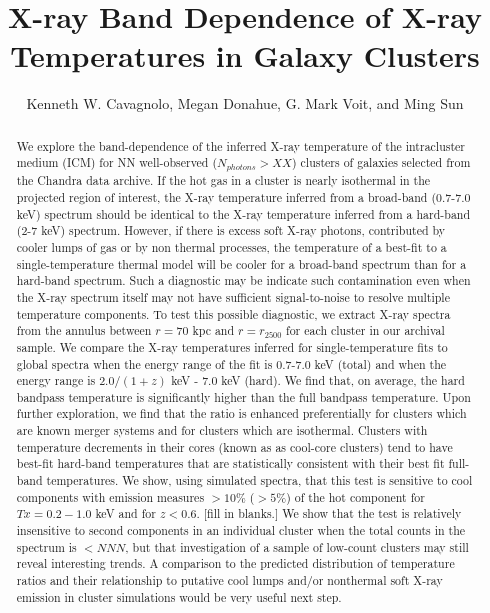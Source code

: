 \documentclass{emulateapj}
\begin{document}
\title{X-ray Band Dependence of X-ray \\
	Temperatures in Galaxy Clusters}
\author{Kenneth W. Cavagnolo, Megan
Donahue, G. Mark Voit, and Ming
Sun}


\begin{abstract}

We explore the band-dependence of the inferred X-ray temperature of the intracluster
medium (ICM) for NN well-observed ($N_{photons} > XX$) 
clusters of galaxies selected from the Chandra data archive. 
If the hot gas in a cluster is nearly isothermal in the projected region of interest, the 
X-ray temperature inferred from a broad-band (0.7-7.0 keV) spectrum should be identical
to the X-ray temperature inferred from a hard-band  (2-7 keV) spectrum. However, 
if there is excess soft X-ray photons, contributed by cooler lumps of gas or by
non thermal processes, the temperature of a best-fit to a single-temperature
thermal model will be cooler for a broad-band spectrum than for a hard-band
spectrum. Such a diagnostic may be indicate such contamination even when the
X-ray spectrum itself may not have sufficient signal-to-noise to resolve multiple
temperature components. To test this possible diagnostic, we extract X-ray
spectra from the annulus between $r=70$ kpc and $r=r_{2500}$ for each cluster in our archival
sample. We compare the X-ray temperatures inferred for single-temperature fits to global spectra when
the energy range of the fit is 0.7-7.0 keV (total) and when the energy range is $2.0/(1+z)$ keV - 
7.0 keV (hard). We find that, on average, the hard bandpass temperature is significantly higher than
the full bandpass temperature. Upon further exploration, we find that the ratio is enhanced preferentially
for clusters which are known merger systems and for clusters which are isothermal. Clusters with
temperature decrements in their cores (known as as cool-core clusters) 
tend to have best-fit hard-band temperatures that are statistically
consistent with their best fit full-band temperatures. We show, using simulated spectra, that
this test is sensitive to cool components with emission measures $> 10\%$ ($>5\%$) of the
hot component for $Tx=0.2-1.0$ keV and for $z<0.6$. [fill in blanks.] 
We show that the test is relatively insensitive to second components in an individual cluster 
when the total counts in the spectrum is $< NNN$, but that investigation of 
a sample of low-count clusters may still reveal interesting trends. 
A comparison to the predicted distribution of temperature ratios and their relationship to 
putative cool lumps and/or nonthermal soft X-ray emission in cluster simulations would be
very useful next step.

\end{abstract}
\end{document}
